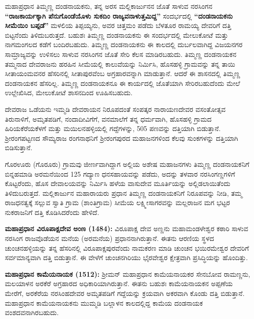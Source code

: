 ಮಹಾಪ್ರಧಾನ ತಿಮ್ಮಣ್ಣ ದಂಡನಾಯಕನು, ತನ್ನ ಅರಸ ಮಲ್ಲಿಕಾರ್ಜುನನ ಜೊತೆ ಸಾಳುವ ನರಸಿಂಗನ \textbf{“ರಾಜಕಾರ್ಯ\-ಕ್ಕಾಗಿ ಪೆನುಗೊಂಡೆಯೊಳು ಸುಕದಿಂ ರಾಜ್ಯವನಾಳುತ್ತಮಿದ್ದ”} ಸಂದರ್ಭದಲ್ಲಿ \textbf{“ದಂಡನಾಯಕನು ಸೀಮೆಯಿಂ ಬಪ್ಪಡೆ”} ಮಳಲಿಯ ತಿಪ್ಪಯ್ಯನು, ಅವರ ಚಿತ್ತಮಂ ಪಡೆದು ಬೆಳತೂರ ರಾಮಯ್ಯ ದೇವರಿಗೆ ದತ್ತಿ ಬಿಟ್ಟನೆಂದು ತಿಳಿದುಬರುತ್ತದೆ. ಬಹುಶಃ ತಿಮ್ಮಣ್ಣ ದಂಡನಾಯಕನು ಈ ಸಂದರ್ಭದಲ್ಲಿ ಮೇಲುಕೋಟೆ ಮತ್ತು ನಾಗಮಂಗಲದ ಕಡೆಗೆ ಬಂದಿರಬಹುದು. ತಿಮ್ಮಣ್ಣ ದಂಡನಾಯಕನು ಈ ಕಾಲದಲ್ಲಿ ದುರ್ಬಲವಾಗಿದ್ದ ವಿಜಯನಗರ ಸಾಮ್ರಾಜ್ಯವನ್ನು ಉಳಿಸಲು ಸಾಳುವ ನರಸಿಂಗನ ಜೊತೆ ಸೇರಿ ಕೆಲಸ ಮಾಡಿರಬಹುದು. ತಿಮ್ಮಣ್ಣ ದಂಡನಾಯಕನ ತಮ್ಮನಾದ ದೇವರಾಜನು ಹರಹಿನ ಸೀಮೆಯಲ್ಲಿ ಕಾಲುವೆಯನ್ನು ನಿರ್ಮಿಸಿ, ಹೊಸಹಳ್ಳಿ ಗ್ರಾಮವನ್ನು ತನ್ನ ತಾಯಿ ಸೀತಾಯಂಮವನರ ಹೆಸರಿನಲ್ಲಿ ಸೀತಾಪುರವೆಂಬ ಅಗ್ರಹಾರವನ್ನಾಗಿ ಮಾಡುತ್ತಾನೆ. ಆದರೆ ಈ ಶಾಸನದಲ್ಲಿ ತಿಮ್ಮಣ್ಣ ದಂಡನಾಯಕನ ಹೆಸರಿಲ್ಲ. ತಿಮ್ಮಣ್ಣ ದಂಡನಾಯಕನೂ ಈ ಕಾರ್ಯದಲ್ಲಿ ಜೊತೆಯಾಗಿ ಸೇರಿರಬಹುದೆಂದು ಮೇಲೆ ಉಲ್ಲೇಖಿಸಿದ, ಮೇಲುಕೋಟೆ ಶಾಸನದಿಂದ ಊಹಿಸಬಹುದು.

ದೇವರಾಜ ಒಡೆಯನು ಇಮ್ಮಡಿ ದೇವರಾಯನ ನಿರೂಪದಂತೆ ಸಂಪತ್ಕರ ನಾರಾಯಣದೇವರ ವಸಂತೋತ್ಸವ ತಿರುನಾಳಿಗೆ, ಅಮೃತಪಡಿಗೆ, ನಂದಾದೀವಿಗೆಗೆ, ವನಮಾಲೆಗೆ ತನ್ನ ಧರ್ಮವಾಗಿ, ಹೊಸಹಳ್ಳಿ ಗ್ರಾಮದ ಹಿರಿಯಕೆರೆಯಕೆಳಗೆ ಮತ್ತು ಮಯಿಲನಹಳ್ಳಿಯಲ್ಲಿ ಗದ್ದೆಗಳನ್ನು, 505 ಪಣವನ್ನು ದತ್ತಿಯಾಗಿ ಬಿಡುತ್ತಾನೆ. ಶ‍್ರೀರಂಗಪಟ್ಟಣದ ಸೌಮ್ಯರಾಜ ರಂಗನಾಥನಿಗೆ ಶ‍್ರೀರಂಗಪುರದ ಮಹಾಜನಗಳಿಂದ ಕೆಲವು ಸುಂಕಗಳನ್ನು ದತ್ತಿಯಾಗಿ ಬಿಡಿಸುತ್ತಾನೆ.

ಗೊರಊರು (ಗೊರೂರು) ಗ್ರಾಮವು ಜೀರ್ಣವಾಗಿದ್ದಾಗ ಅಲ್ಲಿಯ ಅಶೇಷ ಮಹಾಜನಗಳು ತಿಮ್ಮಣ್ಣ ದಂಡನಾಯಕ\-ನಿಗೆ ಬಿನ್ನಹಮಾಡಿ ಅರಮನೆಯಿಂದ 125 ಗದ್ಯಾಣ ಧನಸಹಾಯವನ್ನು ಪಡೆದು, ಅದನ್ನು ತಳವಾರ ನರಸಿಂಗಣ್ಣಗಳಿಗೆ ಕೊಟ್ಟರೆಂದು, ಹೊಸ ದೇವಾಲಯವನ್ನು ನಿರ್ಮಿಸಿ ಹಳೆಯ ವಾಸುದೇವ ಮೂರ್ತಿಯನ್ನು ಅಲ್ಲಿಡಲಾಯಿತೆಂದು ತಿಳಿದು\-ಬರುತ್ತದೆ. ಮಲ್ಲಿಕಾರ್ಜುನ ಮಹಾರಾಯರು ಪ್ರಧಾನ ತಿಮ್ಮಣ್ಣ ದಂಡನಾಯಕನಿಗೆ ನಿರೂಪವನ್ನು ನೀಡಿ, ತಮ್ಮ ರಾಜಧನತ್ವಕ್ಕೆ ಸಲ್ಲುವ ಸ್ವಾತಿ ಗ್ರಾಮ (ಶಾಂತಿಗ್ರಾಮ) ಸೀಮೆಯ ಲಕ್ಷ್ಮೀಸಾಗರವನ್ನು ಮಲ್ಲರಾಜನ ಮಗ ಭಟ್ಟರ ನುಕರಾಜನಿಗೆ ದತ್ತಿ ಕೊಡಿಸಿದರೆಂದು ಹೇಳಿದೆ.

\textbf{ಮಹಾಪ್ರಧಾನ ವಿರೂಪಾಕ್ಷದೇವ ಅಂಣ (1484):} ವಿರೂಪಾಕ್ಷ ದೇವ ಅಣ್ಣನು ಮಹಾಮಂಡಳೇಶ್ವರ ಕಠಾರಿ ಸಾಳುವ ನರಸಿಂಗ ರಾಜವೊಡೆಯನ ಮನೆಯ (ಅರಮನೆಯ) ಪ್ರಧಾನನಾಗಿರುತ್ತಾನೆ. ಈತನು ಆರಣಿಯ ಸ್ಥಳದ ಚುಂಚನಹಳ್ಳಿಯನ್ನು ತನ್ನ ಹೆಸರಿನಲ್ಲಿ ವಿರೂಪಾಕ್ಷಪುರವೆಂದು ನಾಮಕರಣ ಮಾಡಿ ಚುಂಚನ ಭಯಿರಮೇಶ್ವರ ದೇವರಿಗೆ ಸರ್ವಮಾನ್ಯವಾಗಿ ದತ್ತಿ ಬಿಡುತ್ತಾನೆ. ಈ ವೇಳೆಗೆ ಚುಂಚನಗಿರಿಯು ಭೈರವೇಶ್ವರ ಕ್ಷೇತ್ರವಾಗಿ ಪ್ರಸಿದ್ಧಿಯನ್ನು ಹೊಂದಿತ್ತು.

\newpage

\textbf{ಮಹಾಪ್ರಧಾನ ಕಾಮೆಯನಾಯಕ (1512):} ಶ‍್ರೀಮನ್​ ಮಹಾಪ್ರಧಾನ ಕಾಮೆಯನಾಯಕರ ಸೇನಬೋವ ರಾಮಣ್ಣನು, ಮಲಯಾಳನ ಅರಕೆರೆ ಅಗ್ರಹಾರದ ಅಧಿಕಾರಿಯಾಗಿರುತ್ತಾನೆ. ಈತನು ಬಹುಶಃ ಕಾಮೆಯನಾಯಕನ ಅಪ್ಪಣೆಯ ಮೇರೆಗೆ, ಅರಕೆರೆಯ ನರಸಿಂಹದೇವರ ಅಮೃತಪಡಿಗೆ ಗದ್ದೆಯನ್ನು ಕ್ರಯವಾಗಿ ಅಕರವಾಗಿ ಕೊಂಡು ದತ್ತಿ ಬಿಡುತ್ತಾನೆ. ಮಹಾಪ್ರಧಾನ ಕಾಮೆಯನಾಯಕನು ಮುಮ್ಮಡಿ ಬಲ್ಲಾಳನ ಕಾಲದಲ್ಲಿದ್ದ ಕಾಮೆಯ ದಂಡನಾಯಕ ವಂಶದವನಾಗಿರಬಹುದು.

